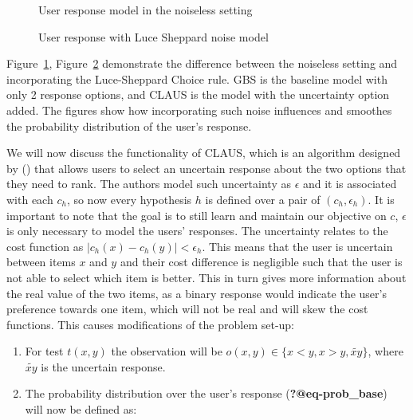 \documentclass[
  letterpaper,
  numbers=noenddot,
  DIV=11]{scrreprt}
\theoremstyle{plain}
\theoremstyle{definition}
\theoremstyle{remark}
\begin{document}
\begin{figure}


\caption{\label{fig-noiseless_1}User response model in the noiseless
setting}

\end{figure}%

\begin{figure}


\caption{\label{fig-noiseless_2}User response with Luce Sheppard noise
model}

\end{figure}%

Figure~\ref{fig-noiseless_1}, Figure~\ref{fig-noiseless_2} demonstrate
the difference between the noiseless setting and incorporating the
Luce-Sheppard Choice rule. GBS is the baseline model with only 2
response options, and CLAUS is the model with the uncertainty option
added. The figures show how incorporating such noise influences and
smoothes the probability distribution of the user's response.

We will now discuss the functionality of CLAUS, which is an algorithm
designed by () that allows
users to select an uncertain response about the two options that they
need to rank. The authors model such uncertainty as \(\epsilon\) and it
is associated with each \(c_h\), so now every hypothesis \(h\) is
defined over a pair of \((c_h, \epsilon_h)\). It is important to note
that the goal is to still learn and maintain our objective on \(c\),
\(\epsilon\) is only necessary to model the users' responses. The
uncertainty relates to the cost function as
\(|c_h(x) - c_h(y)| < \epsilon_h\). This means that the user is
uncertain between items \(x\) and \(y\) and their cost difference is
negligible such that the user is not able to select which item is
better. This in turn gives more information about the real value of the
two items, as a binary response would indicate the user's preference
towards one item, which will not be real and will skew the cost
functions. This causes modifications of the problem set-up:

\begin{enumerate}
\def\labelenumi{\arabic{enumi}.}
\item
  For test \(t(x,y)\) the observation will be
  \(o(x,y) \in \{x<y, x>y, \tilde{xy}\}\), where \(\tilde{xy}\) is the
  uncertain response.
\item
  The probability distribution over the user's response
  (\textbf{?@eq-prob\_base}) will now be defined as:
\end{enumerate}
\end{document}

